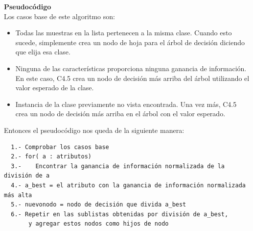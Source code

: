 \documentclass{article}
\begin{document}
{\bf Pseudocódigo}\\
Los casos base de este algoritmo son:
\begin{itemize}
  \item Todas las muestras en la lista pertenecen a la misma clase. Cuando esto sucede, simplemente crea un nodo de hoja para el árbol de decisión diciendo que elija esa clase.
  \item Ninguna de las características proporciona ninguna ganancia de información. En este caso, C4.5 crea un nodo de decisión más arriba del árbol utilizando el valor esperado de la clase.
  \item Instancia de la clase previamente no vista encontrada. Una vez más, C4.5 crea un nodo de decisión más arriba en el árbol con el valor esperado.
\end{itemize}
Entonces el pseudocódigo nos queda de la siguiente manera:
\begin{verbatim}
  1.- Comprobar los casos base
  2.- for( a : atributos)
  3.-    Encontrar la ganancia de información normalizada de la división de a
  4.- a_best = el atributo con la ganancia de información normalizada más alta
  5.- nuevonodo = nodo de decisión que divida a_best
  6.- Repetir en las sublistas obtenidas por división de a_best,
       y agregar estos nodos como hijos de nodo
\end{verbatim}
\end{document}
